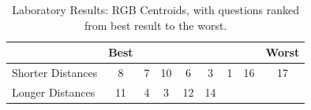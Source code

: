 \begin{table}[htbp]
  \centering
  \begin{tabular}{@{}lcccccccc@{}}
  \toprule
      & \multicolumn{1}{l}{Best}                        & \multicolumn{1}{l}{}                            & \multicolumn{1}{l}{}                           & \multicolumn{1}{l}{}                            & \multicolumn{1}{l}{}                            & \multicolumn{1}{l}{}                            & \multicolumn{1}{l}{}                            & \multicolumn{1}{l}{Worst}                       \\ \midrule
  \multicolumn{1}{l|}{Shorter Distances} & \multicolumn{1}{c||}{\cellcolor[HTML]{FF0000}8} & \multicolumn{1}{c||}{\cellcolor[HTML]{0000FF}7}  & \multicolumn{1}{c||}{\cellcolor[HTML]{0080FF}10} & \multicolumn{1}{c||}{\cellcolor[HTML]{FF8000}6}  & \multicolumn{1}{c||}{\cellcolor[HTML]{80FF00}3} & \multicolumn{1}{c||}{\cellcolor[HTML]{FFFF00}1} & \multicolumn{1}{c||}{\cellcolor[HTML]{FF007F}16} & \multicolumn{1}{c|}{\cellcolor[HTML]{00FF00}17} \\ \midrule
  \multicolumn{1}{l|}{Longer Distances}  & \multicolumn{1}{c||}{\cellcolor[HTML]{FF8000}11} & \multicolumn{1}{c||}{\cellcolor[HTML]{7F00FF}4} & \multicolumn{1}{c||}{\cellcolor[HTML]{80FF00}3} & \multicolumn{1}{c||}{\cellcolor[HTML]{80FF00}12} & \multicolumn{1}{c|}{\cellcolor[HTML]{8000FF}14} & & & \\ \bottomrule
  \end{tabular}
  \caption[Laboratory Results: RGB Centroids]{Laboratory Results: RGB Centroids, with questions ranked from best result to the worst.}
  \label{table:centroids_rgbresults}
\end{table}
%
